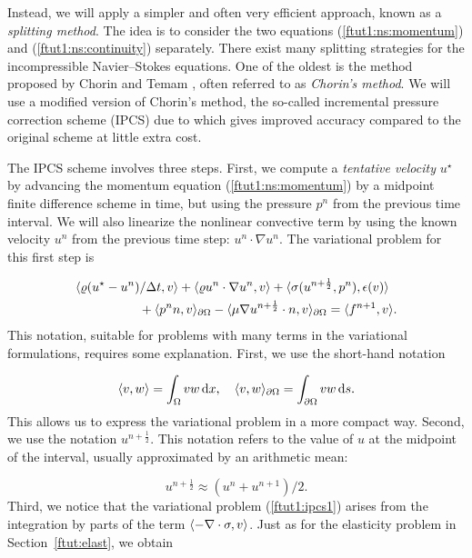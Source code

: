 \documentclass[graybox,envcountchap,sectrefs,final]{svmonodo}
\begin{document}

Instead, we will apply a simpler and often very efficient approach,
known as a \emph{splitting method}. The idea is to
consider the two equations (\ref{ftut1:ns:momentum}) and
(\ref{ftut1:ns:continuity}) separately. There exist many splitting
strategies for the incompressible Navier--Stokes equations. One of the
oldest is the method proposed by Chorin \cite{Chorin1968} and
Temam \cite{Temam1969}, often referred to as \emph{Chorin's method}. We will
use a modified version of Chorin's method, the so-called incremental
pressure correction scheme (IPCS) due to \cite{Goda1979} which gives
improved accuracy compared to the original scheme at little extra
cost.

The IPCS scheme involves three steps. First, we compute a \emph{tentative
velocity} $u^{\star}$ by advancing the momentum equation
(\ref{ftut1:ns:momentum}) by a midpoint finite difference scheme in
time, but using the pressure $p^{n}$ from the
previous time interval. We will also linearize the nonlinear convective
term by using the known velocity $u^{n}$ from the previous time step:
$u^{n}\cdot\nabla u^{n}$.
The variational problem for this first step is

\begin{align}
\label{ftut1:ipcs1}
      & \langle {\varrho(u^{\star} - u^{n}) / \dt},{v} \rangle
      + \langle {\varrho u^{n} \cdot \nabla u^{n}},{v} \rangle
      + \nonumber
        \langle {\sigma(u^{n+\frac{1}{2}}, p^{n})},{\epsilon(v)} \rangle \\
      &\quad\quad\quad\quad\quad
      + \langle {p^{n} n},{v} \rangle_{\partial\Omega}
      - \langle {\mu\nabla u^{n+\frac{1}{2}}\cdot n},{v} \rangle_{\partial\Omega}
      = \langle {f^{n+1}},{v} \rangle.
\end{align}
This notation, suitable for problems with many terms in the variational
formulations, requires some explanation. First, we use the short-hand
notation

\[
  \inner{v}{w} = \int_{\Omega} vw \dx, \quad
  \inner{v}{w}_{\partial\Omega} = \int_{\partial\Omega} vw \ds.
\]
This allows us to express the variational problem in a more compact
way. Second, we use the notation $u^{n+\frac{1}{2}}$. This notation
refers to the value of $u$ at the midpoint of the interval, usually
approximated by an arithmetic mean:

\[
  u^{n+\frac{1}{2}} \approx (u^n + u^{n+1}) / 2.
\]
Third, we notice that the variational problem (\ref{ftut1:ipcs1})
arises from the integration by parts of the term
$\inner{-\nabla\cdot\sigma}{v}$. Just as for the elasticity problem in
Section~\ref{ftut:elast}, we obtain
\end{document}
